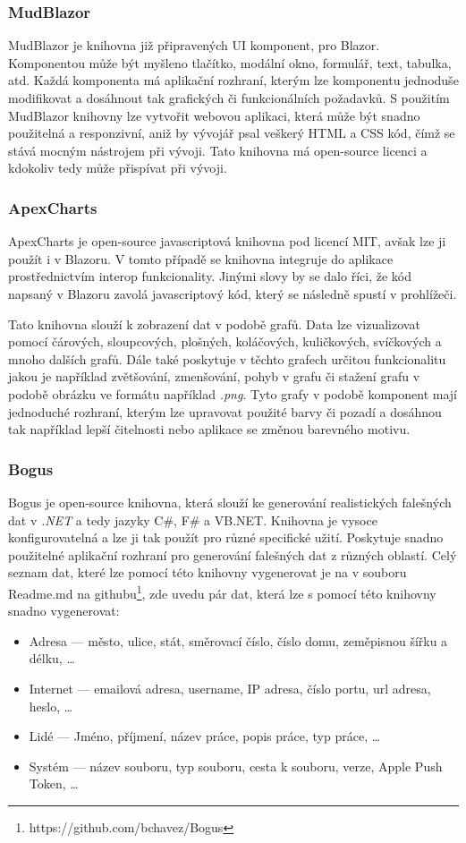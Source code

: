     \subsubsection*{MudBlazor}
    MudBlazor je knihovna již připravených \gls{UI} komponent, pro Blazor. Komponentou může být myšleno tlačítko, modální okno, formulář, text, tabulka, atd. Každá komponenta má aplikační rozhraní, kterým lze komponentu jednoduše modifikovat a dosáhnout tak grafických či funkcionálních požadavků. S použitím MudBlazor knihovny lze vytvořit webovou aplikaci, která může být snadno použitelná a responzivní, aniž by vývojář psal veškerý HTML a CSS kód, čímž se stává mocným nástrojem při vývoji. Tato knihovna má open-source licenci a kdokoliv tedy může přispívat při vývoji.
    
    \subsubsection*{ApexCharts}
    ApexCharts je open-source javascriptová knihovna pod licencí MIT, avšak lze ji použít i v Blazoru. V tomto případě se knihovna integruje do aplikace prostřednictvím interop funkcionality. Jinými slovy by se dalo říci, že kód napsaný v Blazoru zavolá javascriptový kód, který se následně spustí v prohlížeči. 
    
    Tato knihovna slouží k zobrazení dat v podobě grafů. Data lze vizualizovat pomocí čárových, sloupcových, plošných, koláčových, kuličkových, svíčkových a mnoho dalších grafů. Dále také poskytuje v těchto grafech určitou funkcionalitu jakou je například zvětšování, zmenšování, pohyb v grafu či stažení grafu v podobě obrázku ve formátu například \textit{.png}. Tyto grafy v podobě komponent mají jednoduché rozhraní, kterým lze upravovat použité barvy či pozadí a dosáhnou tak například lepší čitelnosti nebo aplikace se změnou barevného motivu.

    \subsubsection*{Bogus}
    Bogus je open-source knihovna, která slouží ke generování realistických falešných dat v \textit{.NET} a tedy jazyky C\#, F\# a VB.NET. Knihovna je vysoce konfigurovatelná a lze ji tak použít pro různé specifické užití. Poskytuje snadno použitelné aplikační rozhraní pro generování falešných dat z různých oblastí. Celý seznam dat, které lze pomocí této knihovny vygenerovat je na v souboru Readme.md na githubu\footnote{https://github.com/bchavez/Bogus}, zde uvedu pár dat, která lze s pomocí této knihovny snadno vygenerovat:
    \begin{itemize}
        \item Adresa --- město, ulice, stát, směrovací číslo, číslo domu, zeměpisnou šířku a délku, …
        \item Internet --- emailová adresa, username, \gls{IP} adresa, číslo portu, url adresa, heslo, …
        \item Lidé --- Jméno, příjmení, název práce, popis práce, typ práce, …
        \item Systém --- název souboru, typ souboru, cesta k souboru, verze, Apple Push Token, …
    \end{itemize}
        
